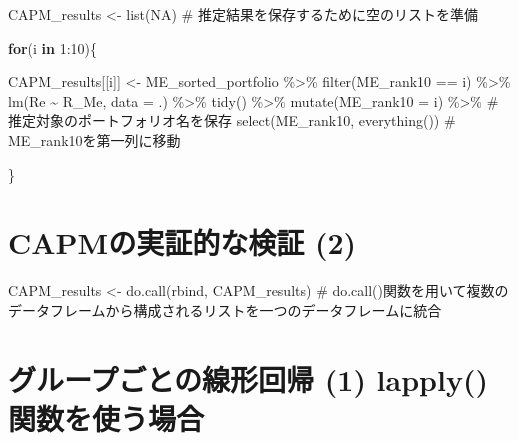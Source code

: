 \documentclass[
  letterpaper,
  DIV=11,
  numbers=noendperiod]{scrreprt}
\newenvironment{Shaded}{\begin{snugshade}}{\end{snugshade}}
\newcommand{\AttributeTok}[1]{\textcolor[rgb]{0.40,0.45,0.13}{#1}}
\newcommand{\CommentTok}[1]{\textcolor[rgb]{0.37,0.37,0.37}{#1}}
\newcommand{\ConstantTok}[1]{\textcolor[rgb]{0.56,0.35,0.01}{#1}}
\newcommand{\ControlFlowTok}[1]{\textcolor[rgb]{0.00,0.23,0.31}{\textbf{#1}}}
\newcommand{\DecValTok}[1]{\textcolor[rgb]{0.68,0.00,0.00}{#1}}
\newcommand{\FunctionTok}[1]{\textcolor[rgb]{0.28,0.35,0.67}{#1}}
\newcommand{\NormalTok}[1]{\textcolor[rgb]{0.00,0.23,0.31}{#1}}
\newcommand{\OtherTok}[1]{\textcolor[rgb]{0.00,0.23,0.31}{#1}}
\newcommand{\SpecialCharTok}[1]{\textcolor[rgb]{0.37,0.37,0.37}{#1}}
\begin{document}
\begin{Shaded}
\begin{Highlighting}[]
\NormalTok{CAPM\_results }\OtherTok{\textless{}{-}} \FunctionTok{list}\NormalTok{(}\ConstantTok{NA}\NormalTok{) }\CommentTok{\# 推定結果を保存するために空のリストを準備}

\ControlFlowTok{for}\NormalTok{(i }\ControlFlowTok{in} \DecValTok{1}\SpecialCharTok{:}\DecValTok{10}\NormalTok{)\{}
  
\NormalTok{  CAPM\_results[[i]] }\OtherTok{\textless{}{-}}\NormalTok{ ME\_sorted\_portfolio }\SpecialCharTok{\%\textgreater{}\%} 
    \FunctionTok{filter}\NormalTok{(ME\_rank10 }\SpecialCharTok{==}\NormalTok{ i) }\SpecialCharTok{\%\textgreater{}\%}
    \FunctionTok{lm}\NormalTok{(Re }\SpecialCharTok{\textasciitilde{}}\NormalTok{ R\_Me, }\AttributeTok{data =}\NormalTok{ .) }\SpecialCharTok{\%\textgreater{}\%}
    \FunctionTok{tidy}\NormalTok{() }\SpecialCharTok{\%\textgreater{}\%} 
    \FunctionTok{mutate}\NormalTok{(}\AttributeTok{ME\_rank10 =}\NormalTok{ i) }\SpecialCharTok{\%\textgreater{}\%} \CommentTok{\# 推定対象のポートフォリオ名を保存}
    \FunctionTok{select}\NormalTok{(ME\_rank10, }\FunctionTok{everything}\NormalTok{()) }\CommentTok{\# ME\_rank10を第一列に移動}
  
\NormalTok{\}}
\end{Highlighting}
\end{Shaded}

\section{CAPMの実証的な検証
(2)}\label{capmux306eux5b9fux8a3cux7684ux306aux691cux8a3c-2}

\begin{Shaded}
\begin{Highlighting}[]
\NormalTok{CAPM\_results }\OtherTok{\textless{}{-}} \FunctionTok{do.call}\NormalTok{(rbind, CAPM\_results) }\CommentTok{\# do.call()関数を用いて複数のデータフレームから構成されるリストを一つのデータフレームに統合}
\end{Highlighting}
\end{Shaded}

\section{グループごとの線形回帰 (1)
lapply()関数を使う場合}\label{ux30b0ux30ebux30fcux30d7ux3054ux3068ux306eux7ddaux5f62ux56deux5e30-1-lapplyux95a2ux6570ux3092ux4f7fux3046ux5834ux5408}
\end{document}
